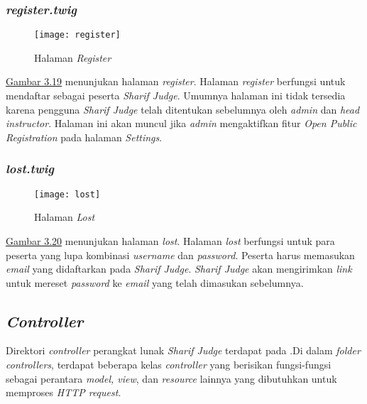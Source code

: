 \subsubsection{\textit{register.twig}}
\begin{figure}[H]
	\centering  
	\texttt{[image: register]}  
	\caption[Halaman \textit{Register}]{Halaman \textit{Register}} 
	\label{fig:register} 
\end{figure} 
\hyperref[fig:register]{Gambar 3.19} menunjukan halaman \textit{register}. Halaman \textit{register} berfungsi untuk mendaftar sebagai peserta \textit{Sharif Judge}. Umumnya halaman ini tidak tersedia karena pengguna \textit{Sharif Judge} telah ditentukan sebelumnya oleh \textit{admin} dan \textit{head instructor}. Halaman ini akan muncul jika \textit{admin} mengaktifkan fitur \textit{Open Public Registration} pada halaman \textit{Settings}.

\subsubsection{\textit{lost.twig}}
\begin{figure}[H]
	\centering  
	\texttt{[image: lost]}  
	\caption[Halaman \textit{Lost}]{Halaman \textit{Lost}} 
	\label{fig:lost} 
\end{figure} 
\hyperref[fig:lost]{Gambar 3.20} menunjukan halaman \textit{lost}. Halaman \textit{lost} berfungsi untuk para peserta yang lupa kombinasi \textit{username} dan \textit{password}. Peserta harus memasukan \textit{email} yang didaftarkan pada \textit{Sharif Judge}. \textit{Sharif Judge} akan mengirimkan \textit{link} untuk mereset \textit{password} ke \textit{email} yang telah dimasukan sebelumnya.

\subsection{\textit{Controller}}
Direktori \textit{controller} perangkat lunak \textit{Sharif Judge} terdapat pada .Di dalam \textit{folder controllers}, terdapat beberapa kelas \textit{controller} yang berisikan fungsi-fungsi sebagai perantara \textit{model, view}, dan \textit{resource} lainnya yang dibutuhkan untuk memproses \textit{HTTP request}.

